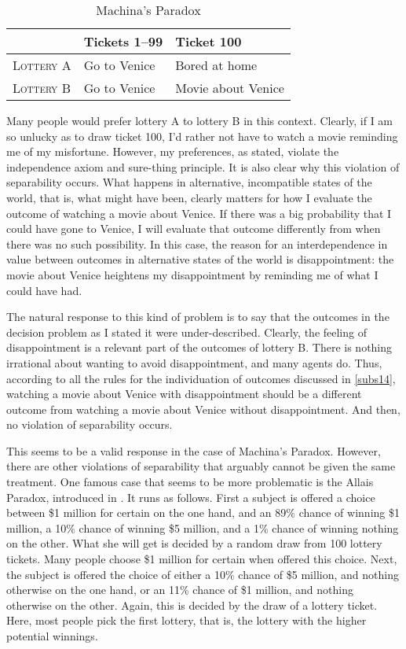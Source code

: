 \begin{table}[h]
\centering
  \begin{tabular}{lll}
  \hline
                      & Tickets 1--99 & Ticket 100\\\hline\hline
  \textsc{Lottery A}  & Go to Venice  & Bored at home \\
  \textsc{Lottery B}  & Go to Venice  & Movie about Venice\\
  \hline
  \end{tabular}
\caption{Machina's Paradox}
\label{t5}
\end{table}

Many people would prefer lottery A to lottery B in this context. Clearly, if I am so unlucky as to draw ticket 100, I'd rather not have to watch a movie reminding me of my misfortune. However, my preferences, as stated, violate the independence axiom and sure-thing principle. It is also clear why this violation of separability occurs. What happens in alternative, incompatible states of the world, that is, what might have been, clearly matters for how I evaluate the outcome of watching a movie about Venice. If there was a big probability that I could have gone to Venice, I will evaluate that outcome differently from when there was no such possibility. In this case, the reason for an interdependence in value between outcomes in alternative states of the world is disappointment: the movie about Venice heightens my disappointment by reminding me of what I could have had.

The natural response to this kind of problem is to say that the outcomes in the decision problem as I stated it were under-described. Clearly, the feeling of disappointment is a relevant part of the outcomes of lottery B. There is nothing irrational about wanting to avoid disappointment, and many agents do. Thus, according to all the rules for the individuation of outcomes discussed in \autoref{subs14}, watching a movie about Venice with disappointment should be a different outcome from watching a movie about Venice without disappointment. And then, no violation of separability occurs.

This seems to be a valid response in the case of Machina's Paradox. However, there are other violations of separability that arguably cannot be given the same treatment. One famous case that seems to be more problematic is the Allais Paradox, introduced in \citet{Allais1953}. It runs as follows. First a subject is offered a choice between \$1 million for certain on the one hand, and an 89\% chance of winning \$1 million, a 10\% chance of winning \$5 million, and a 1\% chance of winning nothing on the other. What she will get is decided by a random draw from 100 lottery tickets. Many people choose \$1 million for certain when offered this choice. Next, the subject is offered the choice of either a 10\% chance of \$5 million, and nothing otherwise on the one hand, or an 11\% chance of \$1 million, and nothing otherwise on the other. Again, this is decided by the draw of a lottery ticket. Here, most people pick the first lottery, that is, the lottery with the higher potential winnings.

